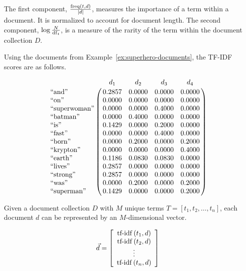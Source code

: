 		\begin{remark}
			The first component, $\frac{\operatorname{freq}\left(t, d\right)}{\mid d \mid}$, measures the importance of a term within a document.  It is normalized to account for document length.  The second component, $\log{\frac{N}{\operatorname{df}_t}}$, is a measure of the rarity of the term within the document collection $D$.
		\end{remark}
		
		\begin{ex}
			Using the documents from Example~\ref{ex:superhero-documents}, the TF-IDF scores are as follows.
			
			$$\bordermatrix{
				~ & d_1 & d_2 & d_3 & d_4 \cr
				\textrm{``and''} & 0.2857 & 0.0000 & 0.0000 & 0.0000 \cr
				\textrm{``on''} & 0.0000 & 0.0000 & 0.0000 & 0.0000 \cr
				\textrm{``superwoman''} & 0.0000 & 0.0000 & 0.4000 & 0.0000 \cr
				\textrm{``batman''} & 0.0000 & 0.4000 & 0.0000 & 0.0000 \cr
				\textrm{``is''} & 0.1429 & 0.0000 & 0.2000 & 0.0000 \cr
				\textrm{``fast''} & 0.0000 & 0.0000 & 0.4000 & 0.0000 \cr
				\textrm{``born''} & 0.0000 & 0.2000 & 0.0000 & 0.2000 \cr
				\textrm{``krypton''} & 0.0000 & 0.0000 & 0.0000 & 0.4000 \cr
				\textrm{``earth''} & 0.1186 & 0.0830 & 0.0830 & 0.0000 \cr
				\textrm{``lives''} & 0.2857 & 0.0000 & 0.0000 & 0.0000 \cr
				\textrm{``strong''} & 0.2857 & 0.0000 & 0.0000 & 0.0000 \cr
				\textrm{``was''} & 0.0000 & 0.2000 & 0.0000 & 0.2000 \cr
				\textrm{``superman''} & 0.1429 & 0.0000 & 0.0000 & 0.2000 \cr
			}$$
		\end{ex}

		\begin{defn}
			Given a document collection $D$ with $M$ unique terms $T = \left[ t_1, t_2, \dotsc, t_n \right]$, each document $d$ can be represented by an $M$-dimensional vector.
			
			$$
				\vec{d} = 
				\left[
				\begin{array}{c}
					\operatorname{tf-idf}\left(t_1, d\right) \\
					\operatorname{tf-idf}\left(t_2, d\right) \\
					\vdots \\
					\operatorname{tf-idf}\left(t_n, d\right)
				\end{array}
				\right]
			$$
		\end{defn}
		
